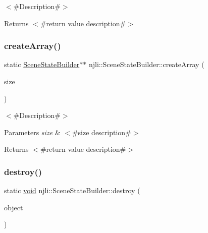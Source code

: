 $<$\#\+Description\#$>$

\begin{DoxyReturn}{Returns}
$<$\#return value description\#$>$ 
\end{DoxyReturn}
\mbox{\label{classnjli_1_1_scene_state_builder_aef4178bb85949d3adf270ac0e4e9584b}} 
\subsubsection{\texorpdfstring{create\+Array()}{createArray()}}
{\footnotesize\ttfamily static \mbox{\hyperlink{classnjli_1_1_scene_state_builder}{Scene\+State\+Builder}}$\ast$$\ast$ njli\+::\+Scene\+State\+Builder\+::create\+Array (\begin{DoxyParamCaption}\item[{const \mbox{\hyperlink{_util_8h_a10e94b422ef0c20dcdec20d31a1f5049}{u32}}}]{size }\end{DoxyParamCaption})\hspace{0.3cm}{\ttfamily [static]}}

$<$\#\+Description\#$>$


\begin{DoxyParams}{Parameters}
{\em size} & $<$\#size description\#$>$\\
\hline
\end{DoxyParams}
\begin{DoxyReturn}{Returns}
$<$\#return value description\#$>$ 
\end{DoxyReturn}
\mbox{\label{classnjli_1_1_scene_state_builder_a02708b50e5123587ea6ec3282900373b}} 
\subsubsection{\texorpdfstring{destroy()}{destroy()}}
{\footnotesize\ttfamily static \mbox{\hyperlink{_thread_8h_af1e856da2e658414cb2456cb6f7ebc66}{void}} njli\+::\+Scene\+State\+Builder\+::destroy (\begin{DoxyParamCaption}\item[{\mbox{\hyperlink{classnjli_1_1_scene_state_builder}{Scene\+State\+Builder}} $\ast$}]{object }\end{DoxyParamCaption})\hspace{0.3cm}{\ttfamily [static]}}

